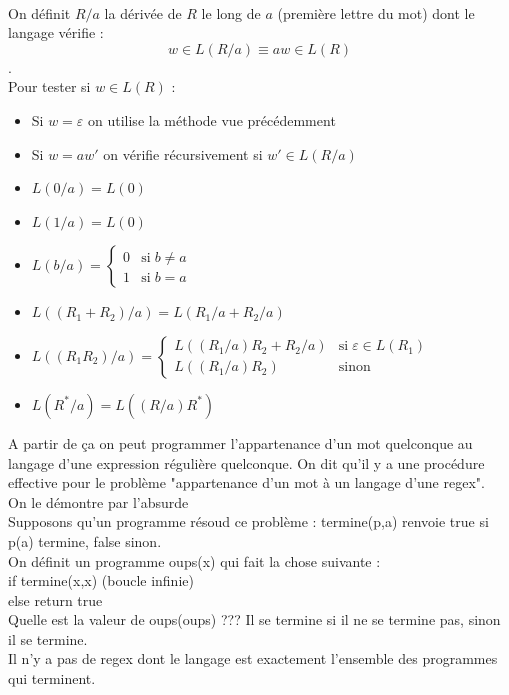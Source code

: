  \\
On définit $R/a$ la dérivée de $R$ le long de $a$ (première lettre du mot) dont le langage vérifie : 
$$ w \in L(R/a) \equiv aw \in L(R)$$. \\
Pour tester si $w \in L(R)$ : 
\begin{itemize}
	\item Si $w=\varepsilon$ on utilise la méthode vue précédemment
	\item Si $w = aw'$ on vérifie récursivement si $w'\in L(R/a)$
\end{itemize}

\begin{itemize}
	\item $L(0/a) = L(0)$
	\item $L(1/a) = L(0)$
	\item $L(b/a) = \left\{ \begin{array}{ll} 0 & \mathrm{si} \; b\neq a \\ 1 & \mathrm{si} \; b = a \end{array} \right.$
	\item $L((R_1+R_2)/a) = L(R_1/a + R_2/a)$ 
	\item $L((R_1R_2)/a) = \left\{ \begin{array}{ll} L((R_1/a)R_2 + R_2/a) & \mathrm{si} \; \varepsilon \in L(R_1) \\ L((R_1/a)R_2) & \mathrm{sinon} \end{array} \right.$
	\item $L(R^*/a) = L((R/a)R^*)$
\end{itemize}

A partir de ça on peut programmer l'appartenance d'un mot quelconque au langage d'une expression régulière quelconque. On dit qu'il y a une procédure effective pour le problème "appartenance d'un mot à un langage d'une regex".\\

 On le démontre par l'absurde \\
Supposons qu'un programme résoud ce problème : termine(p,a) renvoie true si p(a) termine, false sinon. \\
On définit un programme oups(x) qui fait la chose suivante :\\
if termine(x,x) (boucle infinie)\\
else return true\\
Quelle est la valeur de oups(oups) ??? Il se termine si il ne se termine pas, sinon il se termine. \\

 Il n'y a pas de regex dont le langage est exactement l'ensemble des programmes qui terminent.\\

